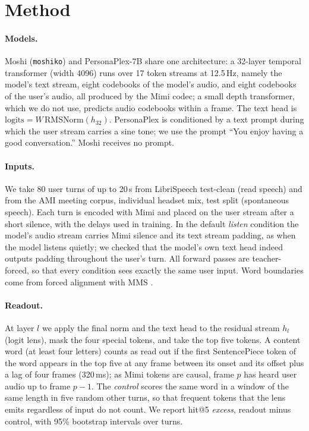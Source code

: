 \documentclass[11pt,a4paper]{article}
\makeatletter
\newcommand{\PP}{PersonaPlex}
\newcommand{\hit}{hit@5}
\makeatother
\begin{document}
\section{Method}
\label{sec:method}

\paragraph{Models.}
Moshi (\texttt{moshiko}) and \PP{}-7B share one architecture: a 32-layer temporal transformer (width 4096) runs over 17 token streams at 12.5\,Hz, namely the model's text stream, eight codebooks of the model's audio, and eight codebooks of the user's audio, all produced by the Mimi codec; a small depth transformer, which we do not use, predicts audio codebooks within a frame.
The text head is $\mathrm{logits}=W\,\mathrm{RMSNorm}(h_{32})$.
\PP{} is conditioned by a text prompt during which the user stream carries a sine tone; we use the prompt ``You enjoy having a good conversation.'' Moshi receives no prompt.

\paragraph{Inputs.}
We take 80 user turns of up to 20\,s from LibriSpeech test-clean \citep{panayotov2015librispeech} (read speech) and from the AMI meeting corpus, individual headset mix, test split \citep{carletta2005ami} (spontaneous speech).
Each turn is encoded with Mimi and placed on the user stream after a short silence, with the delays used in training.
In the default \emph{listen} condition the model's audio stream carries Mimi silence and its text stream padding, as when the model listens quietly; we checked that the model's own text head indeed outputs padding throughout the user's turn.
All forward passes are teacher-forced, so that every condition sees exactly the same user input.
Word boundaries come from forced alignment with MMS \citep{pratap2024mms}.

\paragraph{Readout.}
At layer $l$ we apply the final norm and the text head to the residual stream $h_l$ (logit lens), mask the four special tokens, and take the top five tokens.
A content word (at least four letters) counts as read out if the first SentencePiece token of the word appears in the top five at any frame between its onset and its offset plus a lag of four frames (320\,ms); as Mimi tokens are causal, frame $p$ has heard user audio up to frame $p{-}1$.
The \emph{control} scores the same word in a window of the same length in five random other turns, so that frequent tokens that the lens emits regardless of input do not count.
We report \hit{} \emph{excess}, readout minus control, with 95\% bootstrap intervals over turns.
\end{document}
